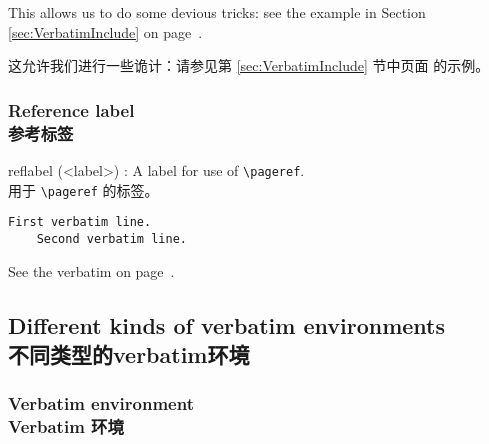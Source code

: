 \documentclass[twoside]{article}
\providecommand\optname[1]{\textsf{#1}}
\newenvironment{optlist}{\begin{description}%
  \renewcommand\makelabel[1]{%
    \descriptionlabel{\mdseries\optname{##1}}}%
  \itemsep0.25\itemsep}%
 {\end{description}}
\newcommand\verbatimTxt{抄录}
\begin{document}
  This allows us to do some devious tricks: see the example in Section
\ref{sec:VerbatimInclude} on page~\pageref{sec:VerbatimInclude}.

这允许我们进行一些诡计：请参见第 \ref{sec:VerbatimInclude} 节中页面 \pageref{sec:VerbatimInclude} 的示例。


\subsubsection{Reference label\\参考标签}

\begin{optlist}
  \item[reflabel (<label>)]: A  label for use of \verb|\pageref|.
\\用于 \verb|\pageref| 的标签。
\end{optlist}

\begin{SideBySideExample}
  \begin{Verbatim}[reflabel=verb0]
    First verbatim line.
    Second verbatim line.
  \end{Verbatim}
  See the verbatim on 
  page~\pageref{verb0}.
\end{SideBySideExample}



\subsection{Different kinds of verbatim environments\\不同类型的verbatim环境}

\subsubsection{Verbatim environment\\Verbatim 环境}
\end{document}
